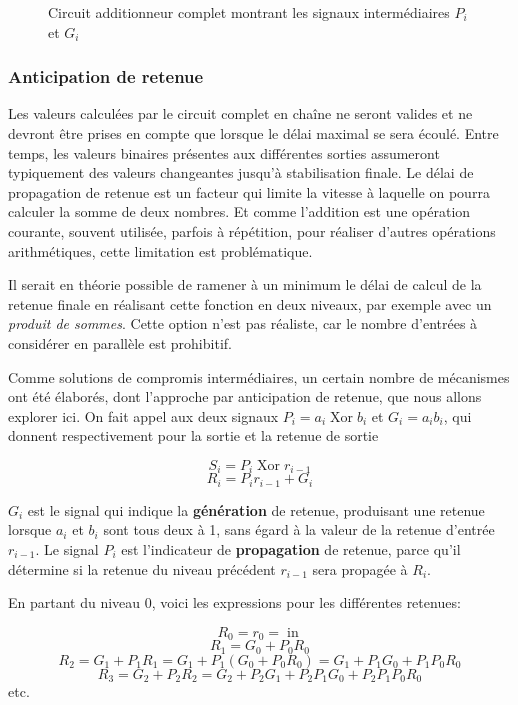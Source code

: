 \documentclass[11pt]{article}
\begin{document}
\begin{figure}[htbp]
\centering

\caption{\label{fig:org096ee6e}Circuit additionneur complet montrant les signaux intermédiaires \(P_i\) et \(G_i\)}
\end{figure}

\subsubsection{Anticipation de retenue}
\label{sec:org610ac7e}

Les valeurs calculées par le circuit complet en chaîne ne seront
valides et ne devront être prises en compte que lorsque le délai
maximal se sera écoulé. Entre temps, les valeurs binaires présentes
aux différentes sorties assumeront typiquement des valeurs changeantes
jusqu'à stabilisation finale. Le délai de propagation de retenue est
un facteur qui limite la vitesse à laquelle on pourra calculer la
somme de deux nombres. Et comme l'addition est une opération courante,
souvent utilisée, parfois à répétition, pour réaliser d'autres
opérations arithmétiques, cette limitation est problématique. 

Il serait en théorie possible de ramener à un minimum le délai de
calcul de la retenue finale en réalisant cette fonction en deux
niveaux, par exemple avec un \emph{produit de sommes}. Cette option n'est pas
réaliste, car le nombre d'entrées à considérer en parallèle est prohibitif.

Comme solutions de compromis intermédiaires, un certain nombre de
mécanismes ont été élaborés, dont l'approche par anticipation de
retenue, que nous allons explorer ici. On fait appel aux deux signaux
\(P_i = a_i \operatorname{Xor} b_i\) et \(G_i = a_i b_i\), qui donnent
respectivement pour la sortie et la retenue de sortie

$$ S_i = P_i \operatorname{Xor} r_{i-1} $$
$$ R_i = P_i r_{i-1} + G_i $$

\(G_i\) est le signal qui indique la \textbf{génération} de retenue,
produisant une retenue lorsque \(a_i\) et \(b_i\) sont tous deux à 1,
sans égard à la valeur de la retenue d'entrée \(r_{i-1}\). Le signal
\(P_i\) est l'indicateur de \textbf{propagation} de retenue, parce qu'il
détermine si la retenue du niveau précédent \(r_{i-1}\) sera propagée
à \(R_i\).

En partant du niveau 0, voici les expressions pour les différentes retenues:

$$ R_0 = r_0 = \operatorname{in}$$
$$ R_1 = G_0 + P_0 R_0 $$
$$ R_2 = G_1 + P_1 R_1 = G_1 + P_1 (G_0 + P_0 R_0) = G_1 + P_1 G_0 + P_1 P_0 R_0 $$
$$ R_3 = G_2 + P_2 R_2 = G_2 + P_2 G_1 + P_2 P_1 G_0 + P_2 P_1 P_0 R_0 $$
etc.
\end{document}
